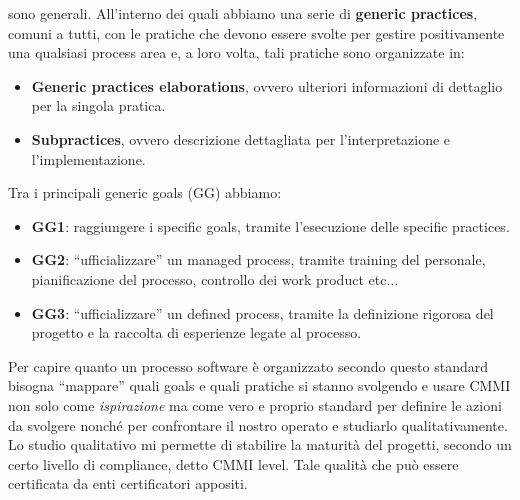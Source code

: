 \begin{itemize}
\begin{enumerate}
                    sono generali. All'interno dei quali abbiamo una serie di \textbf{generic practices},
                    comuni a tutti, con le pratiche che devono essere svolte per gestire
                    positivamente una qualsiasi process area e, a loro volta, tali pratiche
                    sono organizzate in:
                    \begin{itemize}
                        \item \textbf{Generic practices elaborations}, ovvero ulteriori
                              informazioni di dettaglio per la singola pratica.
                        \item \textbf{Subpractices}, ovvero descrizione dettagliata per
                              l'interpretazione e l'implementazione.
                    \end{itemize}

                    Tra i principali generic goals (GG) abbiamo:
                    \begin{itemize}
                        \item \textbf{GG1}: raggiungere i specific goals, tramite l'esecuzione
                              delle specific practices.
                        \item \textbf{GG2}: “ufficializzare” un managed process, tramite
                              training del personale, pianificazione del processo, controllo dei
                              work product etc$\dots$
                        \item \textbf{GG3}: “ufficializzare” un defined process, tramite la
                              definizione rigorosa del progetto e la raccolta di esperienze legate
                              al processo.
                    \end{itemize}
          \end{enumerate}
\end{itemize}

Per capire quanto un processo software è organizzato secondo questo standard
bisogna “mappare” quali goals e quali pratiche si stanno svolgendo e usare CMMI
non solo come \textit{ispirazione} ma come vero e proprio standard per definire
le azioni da svolgere nonché per confrontare il nostro operato e studiarlo
qualitativamente. Lo studio qualitativo mi permette di stabilire la maturità del
progetti, secondo un certo livello di compliance, detto CMMI level. Tale qualità
che può essere certificata da enti certificatori appositi.

